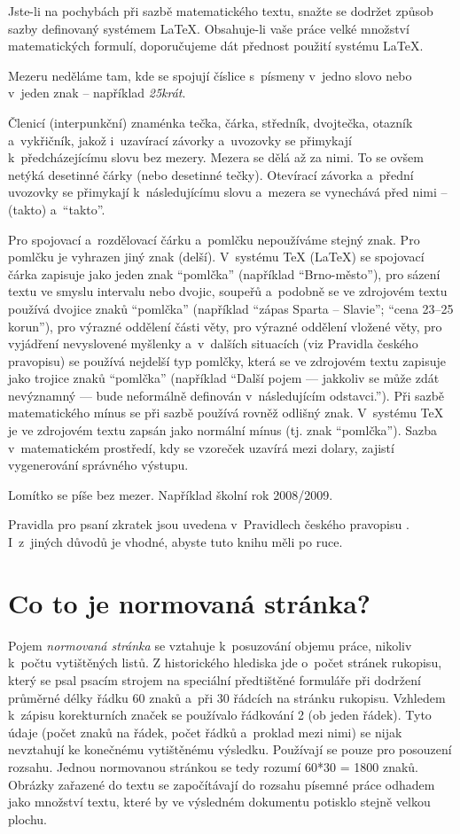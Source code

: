 Jste-li na pochybách při sazbě matematického textu, snažte se dodržet způsob sazby definovaný systémem LaTeX. Obsahuje-li vaše práce velké množství matematických formulí, doporučujeme dát přednost použití systému LaTeX.

Mezeru neděláme tam, kde se spojují číslice s~písmeny v~jedno slovo nebo v~jeden znak -- například {\it 25krát}.

Členicí (interpunkční) znaménka tečka, čárka, středník, dvojtečka, otazník a~vykřičník, jakož i~uzavírací závorky a~uvozovky se přimykají k~předcházejícímu slovu bez mezery. Mezera se dělá až za nimi. To se ovšem netýká desetinné čárky (nebo desetinné tečky). Otevírací závorka a~přední uvozovky se přimykají k~následujícímu slovu a~mezera se vynechává před nimi -- (takto) a~``takto''.

Pro spojovací a~rozdělovací čárku a~pomlčku nepoužíváme stejný znak. Pro pomlčku je vyhrazen jiný znak (delší). V~systému TeX (LaTeX) se spojovací čárka zapisuje jako jeden znak ``pomlčka'' (například ``Brno-město''), pro sázení textu ve smyslu intervalu nebo dvojic, soupeřů a~podobně se ve zdrojovém textu používá dvojice znaků ``pomlčka'' (například ``zápas Sparta -- Slavie''; ``cena 23--25 korun''), pro výrazné oddělení části věty, pro výrazné oddělení vložené věty, pro vyjádření nevyslovené myšlenky a~v~dalších situacích (viz Pravidla českého pravopisu) se používá nejdelší typ pomlčky, která se ve zdrojovém textu zapisuje jako trojice znaků ``pomlčka'' (například ``Další pojem --- jakkoliv se může zdát nevýznamný --- bude neformálně definován v~následujícím odstavci.''). Při sazbě matematického mínus se při sazbě používá rovněž odlišný znak. V~systému TeX je ve zdrojovém textu zapsán jako normální mínus (tj. znak ``pomlčka''). Sazba v~matematickém prostředí, kdy se vzoreček uzavírá mezi dolary, zajistí vygenerování správného výstupu.

Lomítko se píše bez mezer. Například školní rok 2008/2009.

Pravidla pro psaní zkratek jsou uvedena v~Pravidlech českého pravopisu \cite{Pravidla}. I~z~jiných důvodů je vhodné, abyste tuto knihu měli po ruce. 


\section{Co to je normovaná stránka?}
Pojem {\it normovaná stránka} se vztahuje k~posuzování objemu práce, nikoliv k~počtu vytištěných listů. Z historického hlediska jde o~počet stránek rukopisu, který se psal psacím strojem na speciální předtištěné formuláře při dodržení průměrné délky řádku 60 znaků a~při 30 řádcích na stránku rukopisu. Vzhledem k~zápisu korekturních značek se používalo řádkování 2 (ob jeden řádek). Tyto údaje (počet znaků na řádek, počet řádků a~proklad mezi nimi) se nijak nevztahují ke konečnému vytištěnému výsledku. Používají se pouze pro posouzení rozsahu. Jednou normovanou stránkou se tedy rozumí 60*30 = 1800 znaků. Obrázky zařazené do textu se započítávají do rozsahu písemné práce odhadem jako množství textu, které by ve výsledném dokumentu potisklo stejně velkou plochu.

